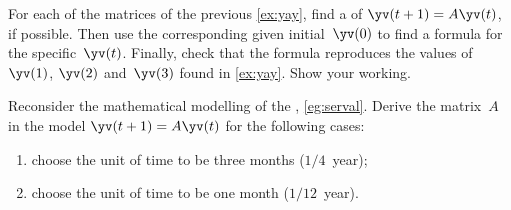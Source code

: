 \begin{exercise} \label{ex:} 
For each of the matrices of the previous \autoref{ex:yay}, find a  of \(\yv(t+1)=A\yv(t)\), if possible.
Then use the corresponding given initial~\(\yv(0)\) to find a formula for the specific~\(\yv(t)\).
Finally, check that the formula reproduces the values of \(\yv(1)\), \(\yv(2)\) and~\(\yv(3)\) found in \autoref{ex:yay}.
Show your working.
\end{exercise}





\begin{exercise} \label{ex:} 
Reconsider the mathematical modelling of the , \autoref{eg:serval}.
Derive the matrix~\(A\) in the model \(\yv(t+1)=A\yv(t)\) for the following cases:
\begin{enumerate}
\item choose the unit of time to be three months (\(1/4\)~year);

\item choose the unit of time to be one month  (\(1/12\)~year).

\end{enumerate}
\end{exercise}







